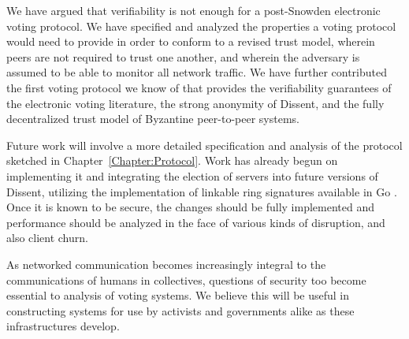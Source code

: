 We have argued that verifiability is not enough for a
post-Snowden electronic voting protocol. We have specified and analyzed the
properties a voting protocol would need to provide in order to conform to a
revised trust model, wherein peers are not required to trust one another, and
wherein the adversary is assumed to be able to monitor all network traffic. We
have further contributed the first voting protocol we know of that provides the
verifiability guarantees of the electronic voting literature, the strong
anonymity of Dissent, and the fully decentralized trust model of Byzantine
peer-to-peer systems.

Future work will involve a more detailed specification and analysis of the
protocol sketched in Chapter~\ref{Chapter:Protocol}. Work has already begun on
implementing it and integrating the election of servers into future versions of
Dissent, utilizing the implementation of linkable ring signatures available in
Go \cite{golrs}. Once it is known to be secure, the changes should be fully
implemented and performance should be analyzed in the face of various kinds of
disruption, and also client churn.

As networked communication becomes increasingly integral to the communications
of humans in collectives, questions of security too become essential to analysis
of voting systems.  We believe this will be useful in constructing systems for
use by activists and governments alike as these infrastructures develop.

